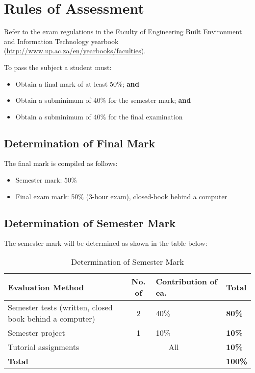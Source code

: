 \section{Rules of Assessment}
    Refer to the exam regulations in the Faculty of Engineering Built
    Environment and Information Technology yearbook
    (\url{http://www.up.ac.za/en/yearbooks/faculties}).

    \noindent
    To pass the subject a student must:
    \begin{itemize}
        \item Obtain a final mark of at least 50\%; {\bf and}
        \item Obtain a subminimum of 40\% for the semester mark; {\bf and}
        \item Obtain a subminimum of 40\% for the final examination
    \end{itemize}

    \subsection{Determination of Final Mark}
        The final mark is compiled as follows:
        \begin{itemize}
            \item Semester mark: 50\%
            \item Final exam mark: 50\% (3-hour exam), closed-book behind a computer
        \end{itemize}

    \subsection{Determination of Semester Mark}
        The semester mark will be determined as shown in the table below:
        \begin{table}[!h]
            \begin{center}
             \begin{tabular}{|p{6cm}|c|l|l|}
               \hline
               {\bf Evaluation Method} & {\bf No. of} &
               {\bf Contribution of ea.} & {\bf Total} \\
               \hline
               Semester tests (written, closed book behind a computer)
               & 2 & 40\% & {\bf 80\%} \\ \hline
               Semester project
               & 1 & 10\% & {\bf 10\%} \\ \hline
               Tutorial assignments
               & \multicolumn{2}{|c|}{All} & {\bf 10\%} \\
               \hline
               \multicolumn{3}{|l|}{{\bf Total}} & {\bf 100\%} \\
               \hline
             \end{tabular}
             \caption{Determination of Semester Mark}
            \end{center}
        \end{table}


